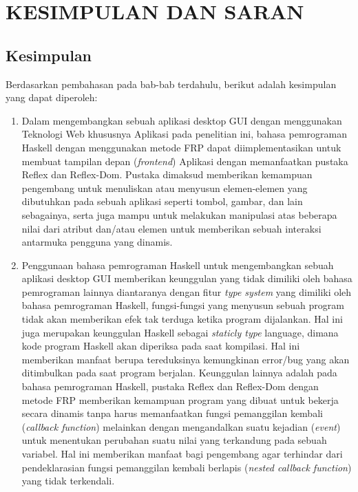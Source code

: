\documentclass[pi.tex]{subfile}
\begin{document}
\chapter{KESIMPULAN DAN SARAN}

\section{Kesimpulan}

Berdasarkan pembahasan pada bab-bab terdahulu, berikut adalah kesimpulan yang dapat diperoleh:
\begin{enumerate}
\item Dalam mengembangkan sebuah aplikasi desktop GUI dengan menggunakan Teknologi Web khususnya Aplikasi pada penelitian ini, bahasa pemrograman Haskell dengan menggunakan metode FRP dapat diimplementasikan untuk membuat tampilan depan (\emph{frontend}) Aplikasi dengan memanfaatkan pustaka Reflex dan Reflex-Dom. Pustaka dimaksud memberikan kemampuan pengembang untuk menuliskan atau menyusun elemen-elemen yang dibutuhkan pada sebuah aplikasi seperti tombol, gambar, dan lain sebagainya, serta juga mampu untuk melakukan manipulasi atas beberapa nilai dari atribut dan/atau elemen untuk memberikan sebuah interaksi antarmuka pengguna yang dinamis.
\item Penggunaan bahasa pemrograman Haskell untuk mengembangkan sebuah aplikasi desktop GUI memberikan keunggulan yang tidak dimiliki oleh bahasa pemrograman lainnya diantaranya dengan fitur \emph{type system} yang dimiliki oleh bahasa pemrograman Haskell, fungsi-fungsi yang menyusun sebuah program tidak akan memberikan efek tak terduga ketika program dijalankan. Hal ini juga merupakan keunggulan Haskell sebagai \emph{staticly type} language, dimana kode program Haskell akan diperiksa pada saat kompilasi. Hal ini memberikan manfaat  berupa tereduksinya kemungkinan error/bug yang akan ditimbulkan pada saat program berjalan. Keunggulan lainnya adalah pada bahasa pemrograman Haskell, pustaka Reflex dan Reflex-Dom dengan metode FRP memberikan kemampuan program yang dibuat untuk bekerja secara dinamis tanpa harus memanfaatkan fungsi pemanggilan kembali (\emph{callback function}) melainkan dengan mengandalkan suatu kejadian (\emph{event}) untuk menentukan perubahan suatu nilai yang terkandung pada sebuah variabel. Hal ini memberikan manfaat bagi pengembang agar terhindar dari pendeklarasian fungsi pemanggilan kembali  berlapis (\emph{nested callback function}) yang tidak terkendali.
  
\end{enumerate}
\end{document}
